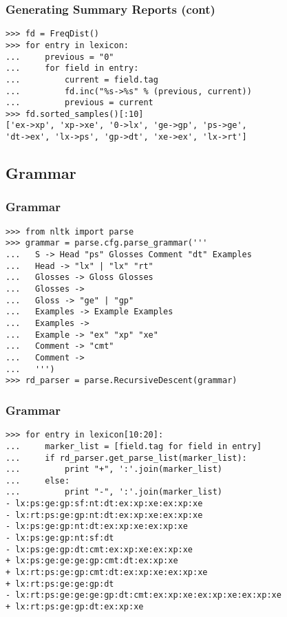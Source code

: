 \documentclass{beamer}             %
\begin{document}
\begin{frame}[fragile]
\frametitle{Generating Summary Reports (cont)}
\small

\begin{verbatim}
>>> fd = FreqDist()
>>> for entry in lexicon:
...     previous = "0"
...     for field in entry:
...         current = field.tag
...         fd.inc("%s->%s" % (previous, current))
...         previous = current
>>> fd.sorted_samples()[:10]
['ex->xp', 'xp->xe', '0->lx', 'ge->gp', 'ps->ge',
'dt->ex', 'lx->ps', 'gp->dt', 'xe->ex', 'lx->rt']
\end{verbatim}
\end{frame}

\subsection{Grammar}

\begin{frame}[fragile]
\frametitle{Grammar}
\small

\begin{verbatim}
>>> from nltk import parse
>>> grammar = parse.cfg.parse_grammar('''
...   S -> Head "ps" Glosses Comment "dt" Examples
...   Head -> "lx" | "lx" "rt"
...   Glosses -> Gloss Glosses
...   Glosses ->
...   Gloss -> "ge" | "gp"
...   Examples -> Example Examples
...   Examples ->
...   Example -> "ex" "xp" "xe"
...   Comment -> "cmt"
...   Comment ->
...   ''')
>>> rd_parser = parse.RecursiveDescent(grammar)
\end{verbatim}
\end{frame}

\begin{frame}[fragile]
\frametitle{Grammar}
\scriptsize

\begin{verbatim}
>>> for entry in lexicon[10:20]:
...     marker_list = [field.tag for field in entry]
...     if rd_parser.get_parse_list(marker_list):
...         print "+", ':'.join(marker_list)
...     else:
...         print "-", ':'.join(marker_list)
- lx:ps:ge:gp:sf:nt:dt:ex:xp:xe:ex:xp:xe
- lx:rt:ps:ge:gp:nt:dt:ex:xp:xe:ex:xp:xe
- lx:ps:ge:gp:nt:dt:ex:xp:xe:ex:xp:xe
- lx:ps:ge:gp:nt:sf:dt
- lx:ps:ge:gp:dt:cmt:ex:xp:xe:ex:xp:xe
+ lx:ps:ge:ge:ge:gp:cmt:dt:ex:xp:xe
+ lx:rt:ps:ge:gp:cmt:dt:ex:xp:xe:ex:xp:xe
+ lx:rt:ps:ge:ge:gp:dt
- lx:rt:ps:ge:ge:ge:gp:dt:cmt:ex:xp:xe:ex:xp:xe:ex:xp:xe
+ lx:rt:ps:ge:gp:dt:ex:xp:xe
\end{verbatim}
\end{frame}
\end{document}
